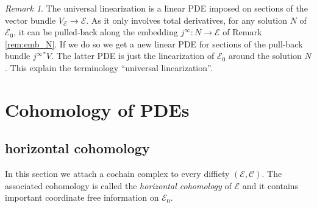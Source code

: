 \documentclass{conm-p-l}
\theoremstyle{definition}
\theoremstyle{remark}
\newtheorem{remark}[theorem]{Remark}
\numberwithin{equation}{section}
\begin{document}
\begin{remark}
The universal linearization is a linear PDE imposed on sections of the vector bundle $V_{\mathscr E} \to \mathscr E$. As it only involves total derivatives, for any solution $N$ of $\mathscr E_0$, it can be pulled-back along the embedding $j^\infty : N \to \mathscr E$ of Remark \ref{rem:emb_N}. If we do so we get a new linear PDE for sections of the pull-back bundle $j^\infty{}^\ast V$. The latter PDE is just the linearization of $\mathscr E_0$ around the solution $N$. This explain the terminology ``universal linearization''.
\end{remark}

\section{Cohomology of PDEs}\label{Sec:Homol}

\subsection{horizontal cohomology}\label{Sec:hor_cohom}
In this section we attach a cochain complex to every diffiety $(\mathscr E, \mathscr C)$. The associated cohomology is called the \emph{horizontal cohomology} of $\mathscr E$ and it contains important coordinate free information on $\mathscr E_0$.
\end{document}
